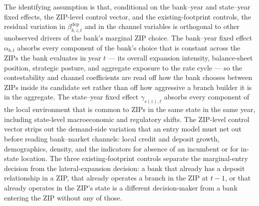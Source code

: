 The identifying assumption is that, conditional on the bank--year and state--year fixed effects, the ZIP-level control vector, and the existing-footprint controls, the residual variation in $\beta^{\mathrm{dep}}_{b,z,t}$ and in the channel variables is orthogonal to other unobserved drivers of the bank's marginal ZIP choice. The bank--year fixed effect $\alpha_{b,t}$ absorbs every component of the bank's choice that is constant across the ZIPs the bank evaluates in year $t$ --- its overall expansion intensity, balance-sheet position, strategic posture, and aggregate exposure to the rate cycle --- so the contestability and channel coefficients are read off how the bank chooses between ZIPs inside its candidate set rather than off how aggressive a branch builder it is in the aggregate. The state--year fixed effect $\gamma_{s(z),t}$ absorbs every component of the local environment that is common to ZIPs in the same state in the same year, including state-level macroeconomic and regulatory shifts. The ZIP-level control vector strips out the demand-side variation that an entry model must net out before reading bank--market channels: local credit and deposit growth, demographics, density, and the indicators for absence of an incumbent or for in-state location. The three existing-footprint controls separate the marginal-entry decision from the lateral-expansion decision: a bank that already has a deposit relationship in a ZIP, that already operates a branch in the ZIP at $t-1$, or that already operates in the ZIP's state is a different decision-maker from a bank entering the ZIP without any of those.

